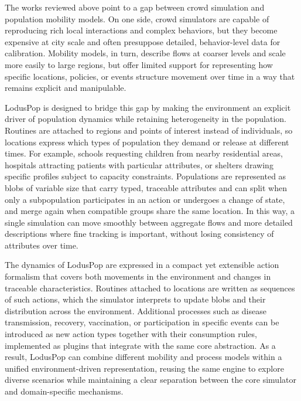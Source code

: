 The works reviewed above point to a gap between crowd simulation and population mobility models. On one side, crowd simulators are capable of reproducing rich local interactions and complex behaviors, but they become expensive at city scale and often presuppose detailed, behavior-level data for calibration. Mobility models, in turn, describe flows at coarser levels and scale more easily to large regions, but offer limited support for representing how specific locations, policies, or events structure movement over time in a way that remains explicit and manipulable.

LodusPop is designed to bridge this gap by making the environment an explicit driver of population dynamics while retaining heterogeneity in the population. Routines are attached to regions and points of interest instead of individuals, so locations express which types of population they demand or release at different times. For example, schools requesting children from nearby residential areas, hospitals attracting patients with particular attributes, or shelters drawing specific profiles subject to capacity constraints. 
Populations are represented as blobs of variable size that carry typed, traceable attributes and can split when only a subpopulation participates in an action or undergoes a change of state, and merge again when compatible groups share the same location. In this way, a single simulation can move smoothly between aggregate flows and more detailed descriptions where fine tracking is important, without losing consistency of attributes over time.

The dynamics of LodusPop are expressed in a compact yet extensible action formalism that covers both movements in the environment and changes in traceable characteristics. 
Routines attached to locations are written as sequences of such actions, which the simulator interprets to update blobs and their distribution across the environment. 
Additional processes such as disease transmission, recovery, vaccination, or participation in specific events can be introduced as new action types together with their consumption rules, implemented as plugins that integrate with the same core abstraction. 
As a result, LodusPop can combine different mobility and process models within a unified environment-driven representation, reusing the same engine to explore diverse scenarios while maintaining a clear separation between the core simulator and domain-specific mechanisms.


